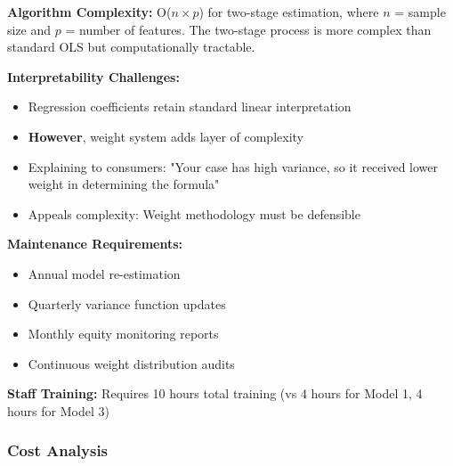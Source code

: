 \textbf{Algorithm Complexity:} O($n \times p$) for two-stage estimation, where $n$ = sample size and $p$ = number of features. The two-stage process is more complex than standard OLS but computationally tractable.

\textbf{Interpretability Challenges:}
\begin{itemize}
    \item Regression coefficients retain standard linear interpretation
    \item \textbf{However}, weight system adds layer of complexity
    \item Explaining to consumers: "Your case has high variance, so it received lower weight in determining the formula"
    \item Appeals complexity: Weight methodology must be defensible
\end{itemize}

\textbf{Maintenance Requirements:}
\begin{itemize}
    \item Annual model re-estimation
    \item Quarterly variance function updates
    \item Monthly equity monitoring reports
    \item Continuous weight distribution audits
\end{itemize}

\textbf{Staff Training:} Requires 10 hours total training (vs 4 hours for Model 1, 4 hours for Model 3)

\subsubsection{Cost Analysis}

